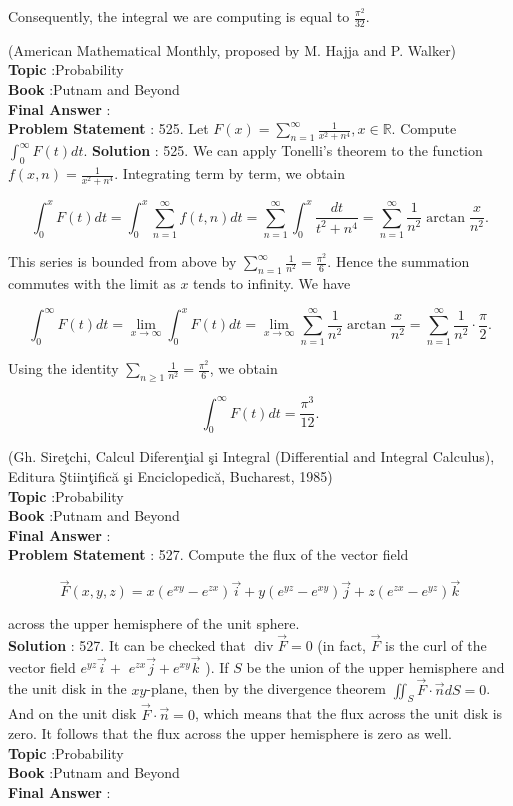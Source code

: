 \documentclass[10pt]{article}
\begin{document}
Consequently, the integral we are computing is equal to $\frac{\pi^{2}}{32}$.

(American Mathematical Monthly, proposed by M. Hajja and P. Walker)
\\
\textbf{Topic} :Probability\\
\textbf{Book} :Putnam and Beyond\\
\textbf{Final Answer} :\\


\textbf{Problem Statement} :
525. Let $F(x)=\sum_{n=1}^{\infty} \frac{1}{x^{2}+n^{4}}, x \in \mathbb{R}$. Compute $\int_{0}^{\infty} F(t) d t$.
\textbf{Solution} :
525. We can apply Tonelli's theorem to the function $f(x, n)=\frac{1}{x^{2}+n^{4}}$. Integrating term by term, we obtain

$$
\int_{0}^{x} F(t) d t=\int_{0}^{x} \sum_{n=1}^{\infty} f(t, n) d t=\sum_{n=1}^{\infty} \int_{0}^{x} \frac{d t}{t^{2}+n^{4}}=\sum_{n=1}^{\infty} \frac{1}{n^{2}} \arctan \frac{x}{n^{2}} .
$$

This series is bounded from above by $\sum_{n=1}^{\infty} \frac{1}{n^{2}}=\frac{\pi^{2}}{6}$. Hence the summation commutes with the limit as $x$ tends to infinity. We have

$$
\int_{0}^{\infty} F(t) d t=\lim _{x \rightarrow \infty} \int_{0}^{x} F(t) d t=\lim _{x \rightarrow \infty} \sum_{n=1}^{\infty} \frac{1}{n^{2}} \arctan \frac{x}{n^{2}}=\sum_{n=1}^{\infty} \frac{1}{n^{2}} \cdot \frac{\pi}{2} .
$$

Using the identity $\sum_{n \geq 1} \frac{1}{n^{2}}=\frac{\pi^{2}}{6}$, we obtain

$$
\int_{0}^{\infty} F(t) d t=\frac{\pi^{3}}{12} .
$$

(Gh. Sireţchi, Calcul Diferenţial şi Integral (Differential and Integral Calculus), Editura Ştiinţifică şi Enciclopedică, Bucharest, 1985)
\\
\textbf{Topic} :Probability\\
\textbf{Book} :Putnam and Beyond\\
\textbf{Final Answer} :\\


\textbf{Problem Statement} :
527. Compute the flux of the vector field

$$
\vec{F}(x, y, z)=x\left(e^{x y}-e^{z x}\right) \vec{i}+y\left(e^{y z}-e^{x y}\right) \vec{j}+z\left(e^{z x}-e^{y z}\right) \vec{k}
$$

across the upper hemisphere of the unit sphere.
\\
\textbf{Solution} :
527. It can be checked that $\operatorname{div} \vec{F}=0$ (in fact, $\vec{F}$ is the curl of the vector field $e^{y z} \vec{i}+$ $e^{z x} \vec{j}+e^{x y} \vec{k}$ ). If $S$ be the union of the upper hemisphere and the unit disk in the $x y$-plane, then by the divergence theorem $\iint_{S} \vec{F} \cdot \vec{n} d S=0$. And on the unit disk $\vec{F} \cdot \vec{n}=0$, which means that the flux across the unit disk is zero. It follows that the flux across the upper hemisphere is zero as well.
\\
\textbf{Topic} :Probability\\
\textbf{Book} :Putnam and Beyond\\
\textbf{Final Answer} :\\
\end{document}
